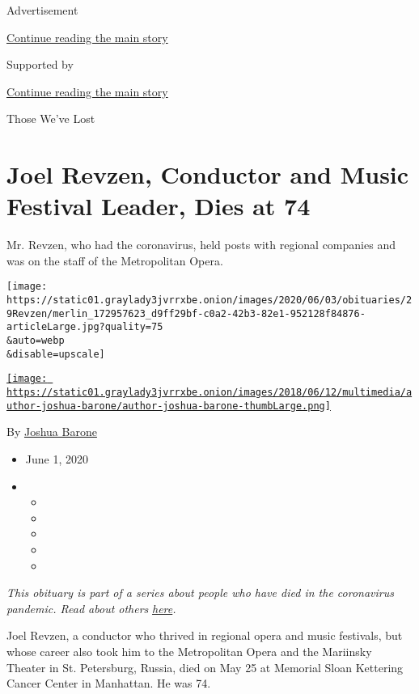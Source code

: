 Advertisement

\protect\hyperlink{after-top}{Continue reading the main story}

Supported by

\protect\hyperlink{after-sponsor}{Continue reading the main story}

Those We've Lost

\hypertarget{joel-revzen-conductor-and-music-festival-leader-dies-at-74}{%
\section{Joel Revzen, Conductor and Music Festival Leader, Dies at
74}\label{joel-revzen-conductor-and-music-festival-leader-dies-at-74}}

Mr. Revzen, who had the coronavirus, held posts with regional companies
and was on the staff of the Metropolitan Opera.

\texttt{[image: https://static01.graylady3jvrrxbe.onion/images/2020/06/03/obituaries/29Revzen/merlin\_172957623\_d9ff29bf-c0a2-42b3-82e1-952128f84876-articleLarge.jpg?quality=75\\\&auto=webp\\\&disable=upscale]}

\href{https://www.nytimes3xbfgragh.onion/by/joshua-barone}{\texttt{[image: https://static01.graylady3jvrrxbe.onion/images/2018/06/12/multimedia/author-joshua-barone/author-joshua-barone-thumbLarge.png]}}

By \href{https://www.nytimes3xbfgragh.onion/by/joshua-barone}{Joshua
Barone}

\begin{itemize}
\item
  June 1, 2020
\item
  \begin{itemize}
  \item
  \item
  \item
  \item
  \item
  \end{itemize}
\end{itemize}

\emph{This obituary is part of a series about people who have died in
the coronavirus pandemic. Read about others}
\href{https://www.nytimes3xbfgragh.onion/interactive/2020/obituaries/people-died-coronavirus-obituaries.html}{\emph{here}}\emph{.}

Joel Revzen, a conductor who thrived in regional opera and music
festivals, but whose career also took him to the Metropolitan Opera and
the Mariinsky Theater in St. Petersburg, Russia, died on May 25 at
Memorial Sloan Kettering Cancer Center in Manhattan. He was 74.

